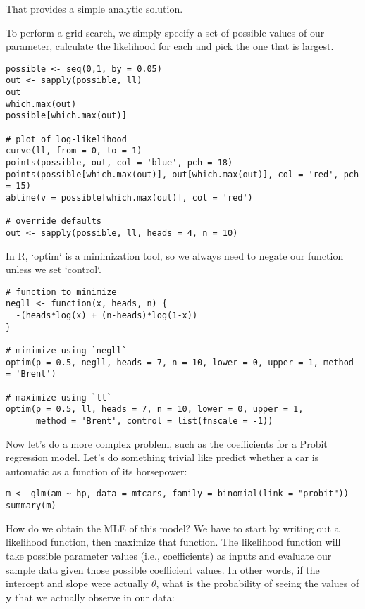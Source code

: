\documentclass[a4paper,12pt]{article}
\newcommand{\matr}[1]{\mathbf{#1}}
\begin{document}
That provides a simple analytic solution.

To perform a grid search, we simply specify a set of possible values of our parameter, calculate the likelihood for each and pick the one that is largest.

\begin{lstlisting}
possible <- seq(0,1, by = 0.05)
out <- sapply(possible, ll)
out
which.max(out)
possible[which.max(out)]

# plot of log-likelihood
curve(ll, from = 0, to = 1)
points(possible, out, col = 'blue', pch = 18)
points(possible[which.max(out)], out[which.max(out)], col = 'red', pch = 15)
abline(v = possible[which.max(out)], col = 'red')

# override defaults
out <- sapply(possible, ll, heads = 4, n = 10)
\end{lstlisting}


In R, `optim` is a minimization tool, so we always need to negate our function unless we set `control`.

\begin{lstlisting}
# function to minimize
negll <- function(x, heads, n) {
  -(heads*log(x) + (n-heads)*log(1-x))
}

# minimize using `negll`
optim(p = 0.5, negll, heads = 7, n = 10, lower = 0, upper = 1, method = 'Brent')

# maximize using `ll`
optim(p = 0.5, ll, heads = 7, n = 10, lower = 0, upper = 1, 
      method = 'Brent', control = list(fnscale = -1))
\end{lstlisting}


Now let's do a more complex problem, such as the coefficients for a Probit regression model. Let's do something trivial like predict whether a car is automatic as a function of its horsepower:

\begin{lstlisting}
m <- glm(am ~ hp, data = mtcars, family = binomial(link = "probit"))
summary(m)
\end{lstlisting}

How do we obtain the MLE of this model? We have to start by writing out a likelihood function, then maximize that function. The likelihood function will take possible parameter values (i.e., coefficients) as inputs and evaluate our sample data given those possible coefficient values. In other words, if the intercept and slope were actually $\theta$, what is the probability of seeing the values of $\matr{y}$ that we actually observe in our data:
\end{document}
